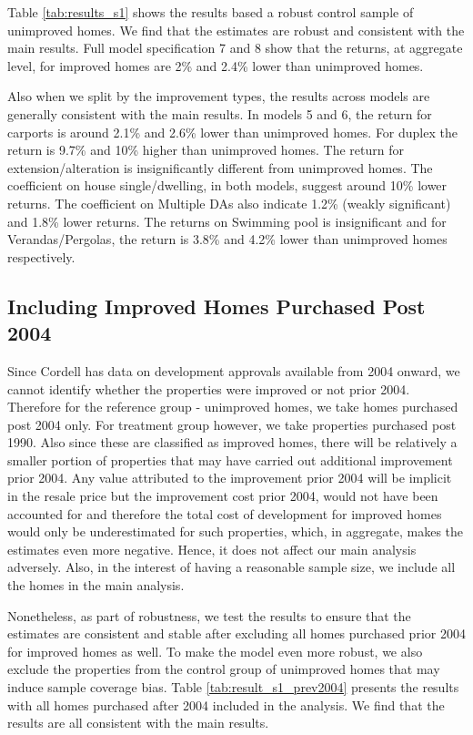 \documentclass[AEJ,reqno, draftmode]{AEA} %
\begin{document}
Table \ref{tab:results_s1} shows the results based a robust control sample of unimproved homes. We find that the estimates are robust and consistent with the main results. Full model specification 7 and 8 show that the returns, at aggregate level, for improved homes are 2\% and 2.4\% lower than unimproved homes. 

Also when we split by the improvement types, the results across models are generally consistent with the main results. In models 5 and 6, the return for carports is around 2.1\% and 2.6\% lower than unimproved homes. For duplex the return is 9.7\% and 10\% higher than unimproved homes. The return for extension/alteration is insignificantly different from unimproved homes. The coefficient on house single/dwelling, in both models, suggest around 10\% lower returns. The coefficient on Multiple DAs also indicate 1.2\% (weakly significant) and 1.8\% lower returns. The returns on Swimming pool is insignificant and for Verandas/Pergolas, the return is 3.8\% and 4.2\% lower than unimproved homes respectively.


\restoregeometry


\subsection{Including Improved Homes Purchased Post 2004}

Since Cordell has data on development approvals available from 2004 onward, we cannot identify whether the properties were improved or not prior 2004. Therefore for the reference group - unimproved homes, we take homes purchased post 2004 only. For treatment group however, we take properties purchased post 1990. Also since these are classified as improved homes, there will be relatively a smaller portion of properties that may have carried out additional improvement prior 2004. Any value attributed to the improvement prior 2004 will be implicit in the resale price but the improvement cost prior 2004, would not have been accounted for and therefore the total cost of development for improved homes would only be underestimated for such properties, which, in aggregate, makes the estimates even more negative. Hence, it does not affect our main analysis adversely. Also, in the interest of having a reasonable sample size, we include all the homes  in the main analysis.

Nonetheless, as part of robustness, we test the results to ensure that the estimates are consistent and stable after excluding all homes purchased prior 2004 for improved homes as well. To make the model even more robust, we also exclude the properties from the control group of unimproved homes that may induce sample coverage bias. Table \ref{tab:result_s1_prev2004} presents the results with all homes purchased after 2004 included in the analysis. We find that the results are all consistent with the main results. 
\end{document}
